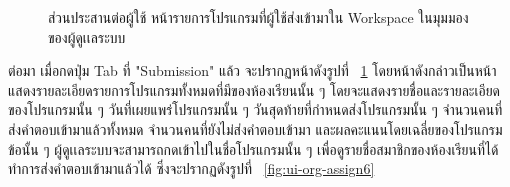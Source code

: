 \documentclass[12pt,oneside,openright,a4paper]{cpe-thai-project}
\begin{document}
    \begin{figure}[H]
    \centering
        \caption[ส่วนประสานต่อผู้ใช้ หน้ารายการโปรแกรมที่ส่งเข้ามาใน Workspace ของผู้ดูเเลระบบ]{ส่วนประสานต่อผู้ใช้ หน้ารายการโปรแกรมที่ผู้ใช้ส่งเข้ามาใน Workspace ในมุมมองของผู้ดูเเลระบบ}
        \label{fig:ui-org-assign5}
    \end{figure}
    \begin{flushleft}
    ต่อมา เมื่อกดปุ่ม Tab ที่ "Submission" แล้ว จะปรากฏหน้าดังรูปที่ ~\ref{fig:ui-org-assign5} โดยหน้าดังกล่าวเป็นหน้าแสดงรายละเอียดรายการโปรแกรมทั้งหมดที่มีของห้องเรียนนั้น ๆ โดยจะแสดงรายชื่อและรายละเอียดของโปรแกรมนั้น ๆ วันที่เผยแพร่โปรแกรมนั้น ๆ วันสุดท้ายที่กำหนดส่งโปรแกรมนั้น ๆ จำนวนคนที่ส่งคำตอบเข้ามาแล้วทั้งหมด จำนวนคนที่ยังไม่ส่งคำตอบเข้ามา และผลคะแนนโดยเฉลี่ยของโปรแกรมข้อนั้น ๆ ผู้ดูเเลระบบจะสามารถกดเข้าไปในชื่อโปรแกรมนั้น ๆ เพื่อดูรายชื่อสมาชิกของห้องเรียนที่ได้ทำการส่งคำตอบเข้ามาแล้วได้ ซึ่งจะปรากฏดังรูปที่ ~\ref{fig:ui-org-assign6}
    \end{flushleft}
    \pagebreak
\end{document}
